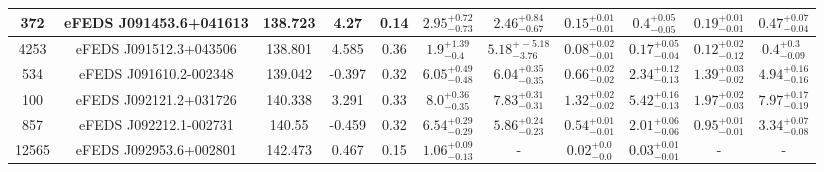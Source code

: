 \documentclass[fleqn,usenatbib]{mnras}
\begin{document}
\begin{table}
\begin{center}
\begin{tabular}{ccccccccccc}
\hline
372 & eFEDS J091453.6+041613 & 138.723 & 4.27 & 0.14 & $2.95^{+0.72}_{-0.73}$ & $2.46^{+0.84}_{-0.67}$ & $0.15^{+0.01}_{-0.01}$ & $0.4^{+0.05}_{-0.05}$ & $0.19^{+0.01}_{-0.01}$ & $0.47^{+0.07}_{-0.04}$ \\ 
\hline
4253 & eFEDS J091512.3+043506 & 138.801 & 4.585 & 0.36 & $1.9^{+1.39}_{-0.4}$ & $5.18^{+-5.18}_{-3.76}$ & $0.08^{+0.02}_{-0.01}$ & $0.17^{+0.05}_{-0.04}$ & $0.12^{+0.02}_{-0.12}$ & $0.4^{+0.3}_{-0.09}$ \\ 
\hline
534 & eFEDS J091610.2-002348 & 139.042 & -0.397 & 0.32 & $6.05^{+0.49}_{-0.48}$ & $6.04^{+0.35}_{-0.35}$ & $0.66^{+0.02}_{-0.02}$ & $2.34^{+0.12}_{-0.13}$ & $1.39^{+0.03}_{-0.02}$ & $4.94^{+0.16}_{-0.16}$ \\ 
\hline
100 & eFEDS J092121.2+031726 & 140.338 & 3.291 & 0.33 & $8.0^{+0.36}_{-0.35}$ & $7.83^{+0.31}_{-0.31}$ & $1.32^{+0.02}_{-0.02}$ & $5.42^{+0.16}_{-0.13}$ & $1.97^{+0.02}_{-0.03}$ & $7.97^{+0.17}_{-0.19}$ \\ 
\hline
857 & eFEDS J092212.1-002731 & 140.55 & -0.459 & 0.32 & $6.54^{+0.29}_{-0.29}$ & $5.86^{+0.24}_{-0.23}$ & $0.54^{+0.01}_{-0.01}$ & $2.01^{+0.06}_{-0.06}$ & $0.95^{+0.01}_{-0.01}$ & $3.34^{+0.07}_{-0.08}$ \\ 
\hline
12565 & eFEDS J092953.6+002801 & 142.473 & 0.467 & 0.15 & $1.06^{+0.09}_{-0.13}$ & - & $0.02^{+0.0}_{-0.0}$ & $0.03^{+0.01}_{-0.01}$ & - & - \\ 
\hline

\end{tabular}
\end{center}
\end{table}






\bsp	%
\label{lastpage}
\end{document}
